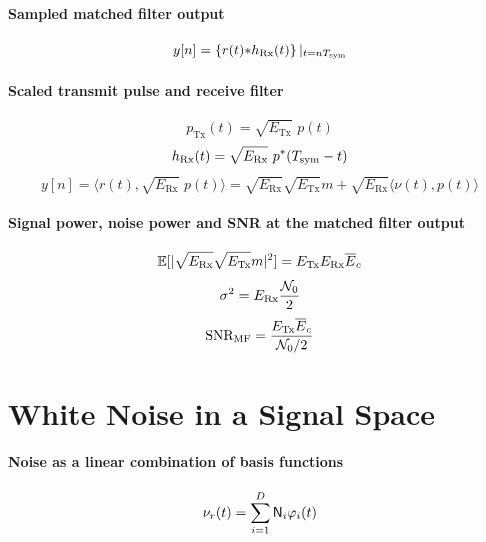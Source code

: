 \paragraph{Sampled matched filter output}
\[
y[n] = \left\{ r(t) {\ast} h_{\textrm{Rx}}(t) \right\} |_{t=n {T_{\textrm{sym}}}}
\]

\paragraph{Scaled transmit pulse and receive filter}
\[
p_{\textrm{Tx}}(t) = \sqrt{E_{\textrm{Tx}}} \textrm{~} p(t)
\]
\[
h_{\textrm{Rx}}(t) = \sqrt{E_{\textrm{Rx}}} \textrm{~} p^*({T_{\textrm{sym}}} - t)
\]
\begin{equation}
y[n]=\langle r(t), \sqrt{E_{\textrm{Rx}}} \textrm{~} p(t) \rangle =
 \sqrt{E_{\textrm{Rx}}} \sqrt{E_{\textrm{Tx}}} m + \sqrt{E_{\textrm{Rx}}} \langle \nu(t), p(t) \rangle
\end{equation}

\paragraph{Signal power, noise power and SNR at the matched filter output}
\begin{equation}
\mathbb{E}[|\sqrt{E_{\textrm{Rx}}} \sqrt{E_{\textrm{Tx}}} m|^2] = E_{\textrm{Tx}} E_{\textrm{Rx}} \overline E_c
\label{eq:mfOutputSignalOfInterest}
\end{equation}
\begin{equation}
\sigma^2 = E_{\textrm{Rx}} \frac{{\cal N}_0}{2}
\label{eq:mfOutputNoiseParcel}
\end{equation}
\begin{equation}
{\textrm{SNR}}_{\textrm{MF}} = \frac{E_{\textrm{Tx}} \overline E_c}{{\cal N}_0/2}
\label{eq:matchedFilterSNR}
\end{equation}

\section*{White Noise in a Signal Space}

\paragraph{Noise as a linear combination of basis functions}
\begin{equation}
\nu_r(t) = \sum_{i=1}^D {\mathsf N}_i \varphi_i(t)
\label{eq:wgnComposedByLinearCombination}
\end{equation}

